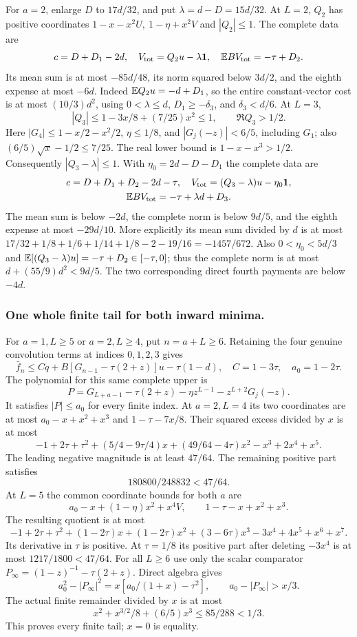 For \(a=2\), enlarge \(D\) to \(17d/32\), and put
\(\lambda=d-D=15d/32\).
At \(L=2\), \(Q_2\) has positive coordinates
\(1-x-x^2U,\ 1-\eta+x^2V\) and \(|Q_2|\le1\).
The complete data are
\[
 c=D+D_1-2d,\quad
 V_{\rm tot}=Q_2u-\lambda\mathbf1,\quad
 \mathbb E BV_{\rm tot}=-\tau+D_2.
\]
Its mean sum is at most \(-85d/48\), its norm squared below
\(3d/2\), and the eighth expense at most \(-6d\).
Indeed \(\mathbb E Q_2u=-d+D_1\), so the entire constant-vector
cost is at most \((10/3)d^2\), using
\(0<\lambda\le d\), \(D_1\ge-\delta_3\), and \(\delta_3<d/6\).
At \(L=3\),
\[
 |Q_3|\le1-3x/8+(7/25)x^2\le1,\qquad \Re Q_3>1/2.
\]
Here \(|G_4|\le1-x/2-x^2/2\), \(\eta\le1/8\), and
\(|G_j(-z)|<6/5\), including \(G_1\); also
\((6/5)\sqrt x-1/2\le7/25\).
The real lower bound is \(1-x-x^3>1/2\).
Consequently \(|Q_3-\lambda|\le1\).
With \(\eta_0=2d-D-D_1\) the complete data are
\[
\begin{gathered}
 c=D+D_1+D_2-2d-\tau,\quad
 V_{\rm tot}=(Q_3-\lambda)u-\eta_0\mathbf1,\\
 \mathbb E BV_{\rm tot}=-\tau+\lambda d+D_3 .
\end{gathered}
\]
The mean sum is below \(-2d\), the complete norm is below
\(9d/5\), and the eighth expense at most \(-29d/10\).
More explicitly its mean sum divided by \(d\) is at most
\(17/32+1/8+1/6+1/14+1/8-2-19/16=-1457/672\).
Also \(0<\eta_0<5d/3\) and
\(\mathbb E[(Q_3-\lambda)u]=-\tau+D_2\in[-\tau,0]\);
thus the complete norm is at most \(d+(55/9)d^2<9d/5\).
The two corresponding direct fourth payments are below \(-4d\).

\subsubsection{One whole finite tail for both inward minima.}\label{part:unit-p:three-tail}
For \(a=1,L\ge5\) or \(a=2,L\ge4\), put \(n=a+L\ge6\).
Retaining the four genuine convolution terms at indices
\(0,1,2,3\) gives
\[
 \bar f_n\le Cq+B[G_{n-1}-\tau(2+z)]u-\tau(1-d),
 \quad C=1-3\tau,\quad a_0=1-2\tau.
\]
The polynomial for this same complete upper is
\[
 P=G_{L+a-1}-\tau(2+z)-\eta z^{L-1}
                                      -z^{L+2}G_j(-z).
\]
It satisfies \(|P|\le a_0\) for every finite index.
At \(a=2,L=4\) its two coordinates are at most
\(a_0-x+x^2+x^3\) and \(1-\tau-7x/8\).
Their squared excess divided by \(x\) is at most
\[
 -1+2\tau+\tau^2+(5/4-9\tau/4)x
              +(49/64-4\tau)x^2-x^3+2x^4+x^5.
\]
The leading negative magnitude is at least \(47/64\).
The remaining positive part satisfies
\[
 180800/248832<47/64.
\]
At \(L=5\) the common coordinate bounds for both \(a\) are
\[
 a_0-x+(1-\eta)x^2+x^4V,\qquad
 1-\tau-x+x^2+x^3.
\]
The resulting quotient is at most
\[
 -1+2\tau+\tau^2+(1-2\tau)x+(1-2\tau)x^2
              +(3-6\tau)x^3-3x^4+4x^5+x^6+x^7 .
\]
Its derivative in \(\tau\) is positive. At \(\tau=1/8\)
its positive part after deleting \(-3x^4\) is at most
\(1217/1800<47/64\).
For all \(L\ge6\) use only the scalar comparator
\(P_\infty=(1-z)^{-1}-\tau(2+z)\). Direct algebra gives
\[
 a_0^2-|P_\infty|^2
    =x[a_0/(1+x)-\tau^2],\qquad
 a_0-|P_\infty|>x/3.
\]
The actual finite remainder divided by \(x\) is at most
\[
 x^2+x^{3/2}/8+(6/5)x^3\le85/288<1/3 .
\]
This proves every finite tail; \(x=0\) is equality.

